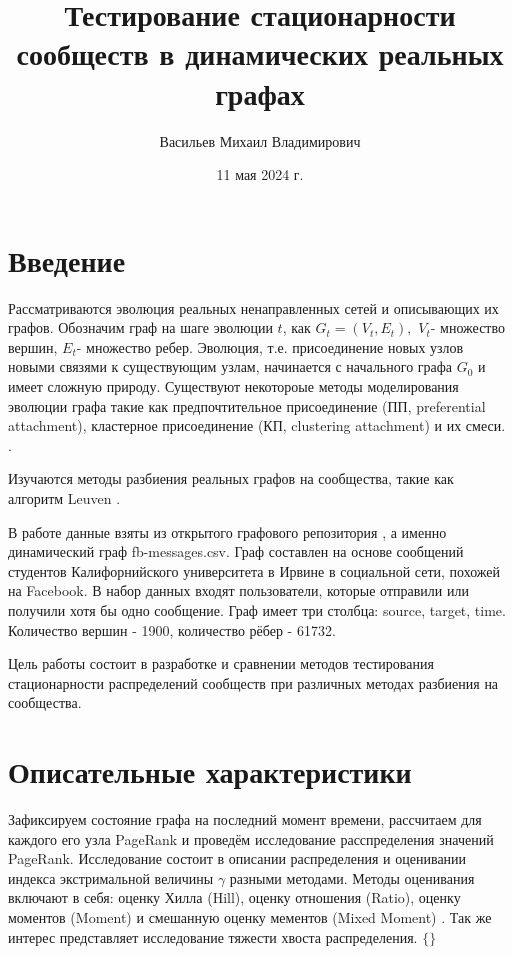 \documentclass[a4paper,12pt]{article}
\begin{document}
\title{Тестирование стационарности сообществ в динамических реальных графах}



\author{Васильев Михаил Владимирович}


\date{11 мая 2024 г.}%
             



\maketitle

\section{Введение}
	Рассматриваются эволюция реальных ненаправленных сетей и описывающих их графов. 
	Обозначим граф на шаге эволюции $t$, как $G_{t}=(V_{t},E_{t}),$ $V_{t}$- множество вершин, $E_{t}$- множество ребер. Эволюция, т.е. присоединение новых узлов новыми связями к существующим узлам, начинается с начального графа $G_{0}$ и имеет сложную природу. Существуют некотороые методы моделирования эволюции графа такие как предпочтительное присоединение (ПП, preferential attachment), кластерное присоединение (КП, clustering attachment) и их смеси. \cite{book9}.
	
	Изучаются методы разбиения реальных графов на сообщества, такие как алгоритм Leuven \cite{book8}. 
	
	В работе данные взяты из открытого графового репозитория \cite{book2}, а именно динамический граф fb-messages.csv. Граф составлен на основе сообщений студентов Калифорнийского университета в Ирвине в социальной сети, похожей на Facebook. В набор данных входят пользователи, которые отправили или получили хотя бы одно сообщение. Граф имеет три столбца: source, target, time. Количество вершин - 1900, количество рёбер - 61732.	
	
	Цель работы состоит в разработке и сравнении методов тестирования стационарности распределений сообществ при различных методах разбиения на сообщества.



\section{Описательные характеристики}
	Зафиксируем состояние графа на последний момент времени, рассчитаем для каждого его узла PageRank и проведём исследование расспределения значений PageRank. Исследование состоит в описании распределения и оценивании индекса экстримальной величины $\gamma$ разными методами. Методы оценивания включают в себя: оценку Хилла (Hill), оценку отношения (Ratio), оценку моментов (Moment) \cite{book10} и смешанную оценку мементов (Mixed Moment) \cite{book11}. Так же интерес представляет исследование тяжести хвоста распределения.
	$\lbrace \rbrace$ \leqslant \rightarrow \in
\end{document}
